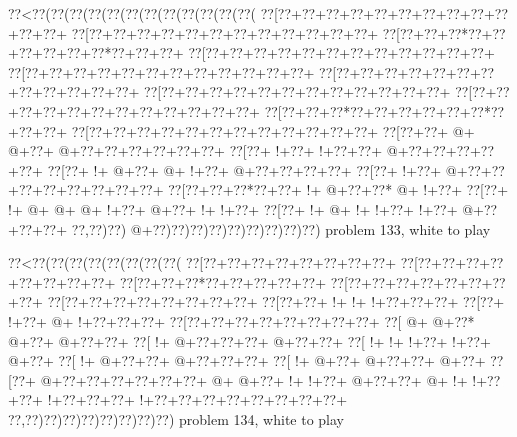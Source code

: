 \vbox{\vbox{\goo
\0??<\0??(\0??(\0??(\0??(\0??(\0??(\0??(\0??(\0??(\0??(\0??(\0??(
\0??[\0??+\0??+\0??+\0??+\0??+\0??+\0??+\0??+\0??+\0??+\0??+\0??+
\0??[\0??+\0??+\0??+\0??+\0??+\0??+\0??+\0??+\0??+\0??+\0??+\0??+
\0??[\0??+\0??+\0??*\0??+\0??+\0??+\0??+\0??+\0??*\0??+\0??+\0??+
\0??[\0??+\0??+\0??+\0??+\0??+\0??+\0??+\0??+\0??+\0??+\0??+\0??+
\0??[\0??+\0??+\0??+\0??+\0??+\0??+\0??+\0??+\0??+\0??+\0??+\0??+
\0??[\0??+\0??+\0??+\0??+\0??+\0??+\0??+\0??+\0??+\0??+\0??+\0??+
\0??[\0??+\0??+\0??+\0??+\0??+\0??+\0??+\0??+\0??+\0??+\0??+\0??+
\0??[\0??+\0??+\0??+\0??+\0??+\0??+\0??+\0??+\0??+\0??+\0??+\0??+
\0??[\0??+\0??+\0??*\0??+\0??+\0??+\0??+\0??+\0??*\0??+\0??+\0??+
\0??[\0??+\0??+\0??+\0??+\0??+\0??+\0??+\0??+\0??+\0??+\0??+\0??+
\0??[\0??+\0??+\- @+\- @+\0??+\- @+\0??+\0??+\0??+\0??+\0??+\0??+
\0??[\0??+\- !+\0??+\- !+\0??+\0??+\- @+\0??+\0??+\0??+\0??+\0??+
\0??[\0??+\- !+\- @+\0??+\- @+\- !+\0??+\- @+\0??+\0??+\0??+\0??+
\0??[\0??+\- !+\0??+\- @+\0??+\0??+\0??+\0??+\0??+\0??+\0??+\0??+
\0??[\0??+\0??+\0??*\0??+\0??+\- !+\- @+\0??+\0??*\- @+\- !+\0??+
\0??[\0??+\- !+\- @+\- @+\- @+\- !+\0??+\- @+\0??+\- !+\- !+\0??+
\0??[\0??+\- !+\- @+\- !+\- !+\0??+\- !+\0??+\- @+\0??+\0??+\0??+
\0??,\0??)\0??)\- @+\0??)\0??)\0??)\0??)\0??)\0??)\0??)\0??)\0??)
}
\hfil problem 133, white to play\hfil\break
}

\vbox{\vbox{\goo
\0??<\0??(\0??(\0??(\0??(\0??(\0??(\0??(\0??(
\0??[\0??+\0??+\0??+\0??+\0??+\0??+\0??+\0??+
\0??[\0??+\0??+\0??+\0??+\0??+\0??+\0??+\0??+
\0??[\0??+\0??+\0??*\0??+\0??+\0??+\0??+\0??+
\0??[\0??+\0??+\0??+\0??+\0??+\0??+\0??+\0??+
\0??[\0??+\0??+\0??+\0??+\0??+\0??+\0??+\0??+
\0??[\0??+\0??+\- !+\- !+\- !+\0??+\0??+\0??+
\0??[\0??+\- !+\0??+\- @+\- !+\0??+\0??+\0??+
\0??[\0??+\0??+\0??+\0??+\0??+\0??+\0??+\0??+
\0??[\- @+\- @+\0??*\- @+\0??+\- @+\0??+\0??+
\0??[\- !+\- @+\0??+\0??+\0??+\- @+\0??+\0??+
\0??[\- !+\- !+\- !+\0??+\- !+\0??+\- @+\0??+
\0??[\- !+\- @+\0??+\0??+\- @+\0??+\0??+\0??+
\0??[\- !+\- @+\0??+\- @+\0??+\0??+\- @+\0??+
\0??[\0??+\- @+\0??+\0??+\0??+\0??+\0??+\0??+
\- @+\- @+\0??+\- !+\- !+\0??+\- @+\0??+\0??+
\- @+\- !+\- !+\0??+\0??+\- !+\0??+\0??+\0??+
\- !+\0??+\0??+\0??+\0??+\0??+\0??+\0??+\0??+
\0??,\0??)\0??)\0??)\0??)\0??)\0??)\0??)\0??)
}
\hfil problem 134, white to play\hfil\break
}

